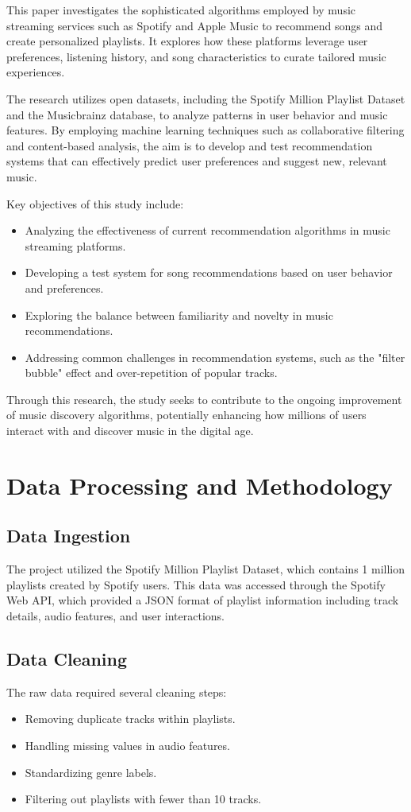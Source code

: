 \documentclass[runningheads]{llncs}
\begin{document}
This paper investigates the sophisticated algorithms employed by music streaming services such as Spotify and Apple Music to recommend songs and create personalized playlists. It explores how these platforms leverage user preferences, listening history, and song characteristics to curate tailored music experiences.

The research utilizes open datasets, including the Spotify Million Playlist Dataset and the Musicbrainz database, to analyze patterns in user behavior and music features. By employing machine learning techniques such as collaborative filtering and content-based analysis, the aim is to develop and test recommendation systems that can effectively predict user preferences and suggest new, relevant music.

Key objectives of this study include:
\begin{itemize}
    \item Analyzing the effectiveness of current recommendation algorithms in music streaming platforms.
    \item Developing a test system for song recommendations based on user behavior and preferences.
    \item Exploring the balance between familiarity and novelty in music recommendations.
    \item Addressing common challenges in recommendation systems, such as the "filter bubble" effect and over-repetition of popular tracks.
\end{itemize}

Through this research, the study seeks to contribute to the ongoing improvement of music discovery algorithms, potentially enhancing how millions of users interact with and discover music in the digital age.

\section{Data Processing and Methodology}

\subsection{Data Ingestion}
The project utilized the Spotify Million Playlist Dataset, which contains 1 million playlists created by Spotify users. This data was accessed through the Spotify Web API, which provided a JSON format of playlist information including track details, audio features, and user interactions.

\subsection{Data Cleaning}
The raw data required several cleaning steps:
\begin{itemize}
    \item Removing duplicate tracks within playlists.
    \item Handling missing values in audio features.
    \item Standardizing genre labels.
    \item Filtering out playlists with fewer than 10 tracks.
\end{itemize}
\end{document}
